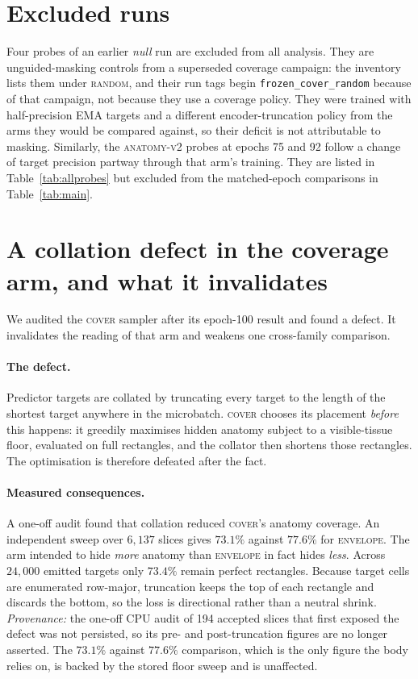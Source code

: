\documentclass{article}
\begin{document}
\section{Excluded runs}
\label{app:excluded}

Four probes of an earlier \emph{null} run are excluded from all analysis. They
are unguided-masking controls from a superseded coverage campaign: the
inventory lists them under \textsc{random}, and their run tags begin
\texttt{frozen\_cover\_random} because of that campaign, not because they use a
coverage policy. They were
trained with half-precision EMA targets and a different encoder-truncation
policy from the arms they would be compared against, so their deficit is not
attributable to masking. Similarly, the \textsc{anatomy-v2} probes at
epochs 75 and 92 follow a change of target precision partway through that arm's
training. They are listed in Table~\ref{tab:allprobes} but excluded from the
matched-epoch comparisons in Table~\ref{tab:main}.

\section{A collation defect in the coverage arm, and what it invalidates}
\label{app:covbug}

We audited the \textsc{cover} sampler after its epoch-100 result and found a
defect. It invalidates the reading of that arm and weakens one cross-family
comparison.

\paragraph{The defect.} Predictor targets are collated by truncating every target
to the length of the shortest target anywhere in the microbatch. \textsc{cover}
chooses its placement \emph{before} this happens: it greedily maximises hidden
anatomy subject to a visible-tissue floor, evaluated on full rectangles, and the
collator then shortens those rectangles. The optimisation is therefore defeated
after the fact.

\paragraph{Measured consequences.} A one-off audit found that collation reduced
\textsc{cover}'s anatomy coverage. An independent sweep over $6{,}137$ slices
gives $73.1\%$ against $77.6\%$ for \textsc{envelope}. The arm intended to hide
\emph{more} anatomy than \textsc{envelope} in fact hides \emph{less}. Across
$24{,}000$ emitted targets only $73.4\%$ remain perfect
rectangles. Because target cells are enumerated row-major, truncation keeps the
top of each rectangle and discards the bottom, so the loss is directional rather
than a neutral shrink. \emph{Provenance:} the one-off CPU audit of 194 accepted
slices that first exposed the defect was not persisted, so its pre- and
post-truncation figures are no longer asserted. The $73.1\%$ against $77.6\%$
comparison, which is the only figure the body relies on, is backed by the stored
floor sweep and is unaffected.
\end{document}
